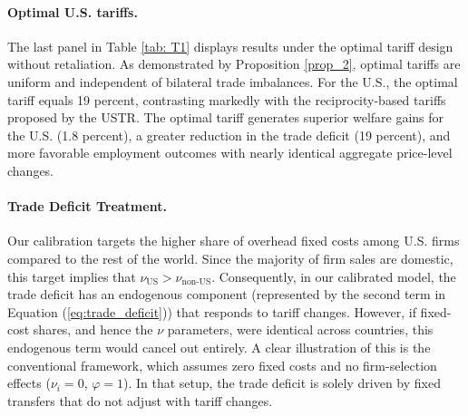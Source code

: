 \documentclass[12pt]{article}
\begin{document}
\paragraph{Optimal U.S. tariffs.}
The last panel in Table  \ref{tab: T1}  displays results under the optimal tariff design without retaliation. As demonstrated by Proposition \ref{prop_2}, optimal tariffs are uniform and independent of bilateral trade imbalances. For the U.S., the optimal tariff equals 19 percent, contrasting markedly with the reciprocity-based tariffs proposed by the USTR. The optimal tariff generates superior welfare gains for the U.S. (1.8 percent), a greater reduction in the trade deficit (19 percent), and more favorable employment outcomes with nearly identical aggregate price-level changes.



\paragraph{Trade Deficit Treatment.} Our calibration targets the higher share of overhead fixed costs among U.S. firms compared to the rest of the world.  Since the majority of firm sales are domestic, this target implies that  $\nu_{\text{US}} > \nu_{\text{non-US}}$. Consequently, in our calibrated model, the trade deficit has an endogenous component (represented by the second term in Equation (\ref{eq:trade_deficit})) that responds to tariff changes. However, if fixed-cost shares, and hence the $\nu$ parameters, were identical across countries, this endogenous term would cancel out entirely. A clear illustration of this is the conventional \citet{DEK} framework, which assumes zero fixed costs and no firm-selection effects ($\nu_i = 0$, $\varphi = 1$). In that setup, the trade deficit is solely driven by fixed transfers that do not adjust with tariff changes.
\end{document}
